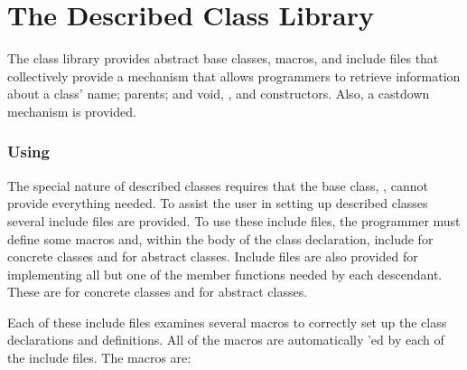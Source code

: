 
\chapter{The Described Class Library}

The class library provides abstract base classes, macros,
and include files that collectively provide a mechanism that
allows programmers to retrieve information about a class'
name; parents; and void, \srccd{\&}, and
\srccd{\&} constructors.  Also, a castdown
mechanism is provided.




\subsection{Using }

The special nature of described classes requires that the base class,
, cannot provide everything needed.  To assist the
user in setting up described classes several include files are provided.
To use these include files, the programmer must define some 
macros and, within the body of the class declaration,
include  for concrete classes and
 for abstract classes.  Include files
are also provided for implementing all but one of the member functions
needed by each  descendant.  These are
 for concrete classes and
 for abstract classes.

Each of these include files examines several 
macros to correctly set up the class declarations and definitions.
All of the macros are automatically
'ed by each of the include files.
The macros are:

